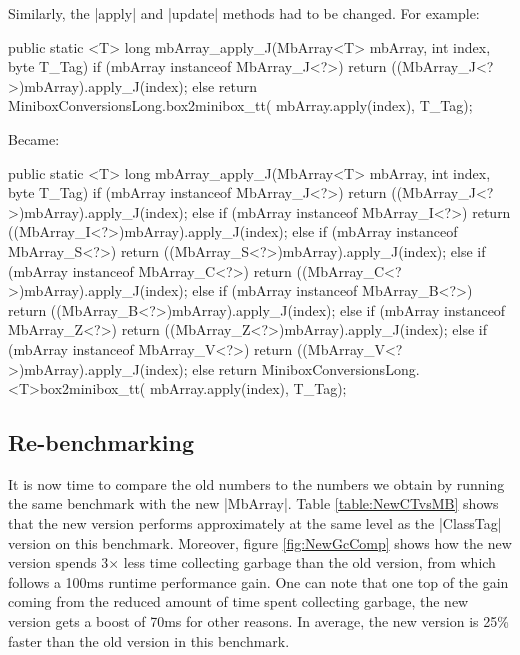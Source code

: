 Similarly, the |apply| and |update| methods had to be changed.
For example:

\begin{lstlisting-nobreak-java}
public static <T> long mbArray_apply_J(MbArray<T> mbArray, int index, byte T_Tag) {
  if (mbArray instanceof MbArray_J<?>)
    return ((MbArray_J<?>)mbArray).apply_J(index);
  else
    return MiniboxConversionsLong.box2minibox_tt(
    	mbArray.apply(index), T_Tag);
}
\end{lstlisting-nobreak-java}

Became:

\begin{lstlisting-nobreak-java}
public static <T> long mbArray_apply_J(MbArray<T> mbArray, int index, byte T_Tag) {
  if (mbArray instanceof MbArray_J<?>)
    return ((MbArray_J<?>)mbArray).apply_J(index);
  else if (mbArray instanceof MbArray_I<?>)
    return ((MbArray_I<?>)mbArray).apply_J(index);
  else if (mbArray instanceof MbArray_S<?>)
    return ((MbArray_S<?>)mbArray).apply_J(index);
  else if (mbArray instanceof MbArray_C<?>)
    return ((MbArray_C<?>)mbArray).apply_J(index);
  else if (mbArray instanceof MbArray_B<?>)
    return ((MbArray_B<?>)mbArray).apply_J(index);
  else if (mbArray instanceof MbArray_Z<?>)
    return ((MbArray_Z<?>)mbArray).apply_J(index);
  else if (mbArray instanceof MbArray_V<?>)
    return ((MbArray_V<?>)mbArray).apply_J(index);
  else
    return MiniboxConversionsLong.<T>box2minibox_tt(
    	mbArray.apply(index), T_Tag);
}
\end{lstlisting-nobreak-java}

\subsection{Re-benchmarking}

It is now time to compare the old numbers to the numbers we obtain by running the same benchmark with the new |MbArray|. Table \ref{table:NewCTvsMB} shows that the new version performs approximately at the same level as the |ClassTag| version on this benchmark. Moreover, figure \ref{fig:NewGcComp} shows how the new version spends 3$\times$ less time collecting garbage than the old version, from which follows a 100ms runtime performance gain. One can note that one top of the gain coming from the reduced amount of time spent collecting garbage, the new version gets a boost of 70ms for other reasons. In average, the new version is 25\% faster than the old version in this benchmark.


